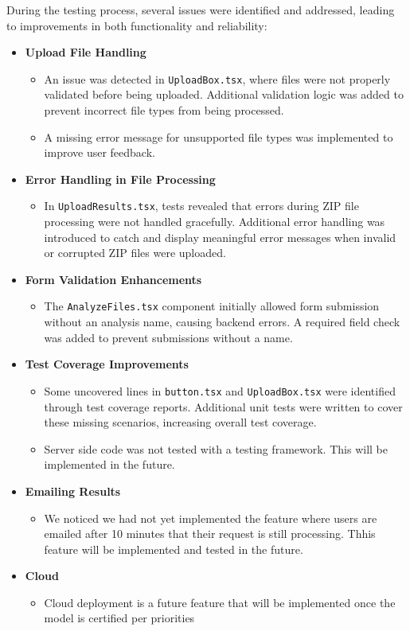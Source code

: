 \documentclass[12pt, titlepage]{article}
\begin{document}
During the testing process, several issues were identified and addressed, leading to improvements in both functionality and reliability:

\begin{itemize}
\item \textbf{Upload File Handling}
\begin{itemize}
\item An issue was detected in \texttt{UploadBox.tsx}, where files were not properly validated before being uploaded. Additional validation logic was added to prevent incorrect file types from being processed.
\item A missing error message for unsupported file types was implemented to improve user feedback.
\end{itemize}
\item \textbf{Error Handling in File Processing}
\begin{itemize}
\item In \texttt{UploadResults.tsx}, tests revealed that errors during ZIP file processing were not handled gracefully. Additional error handling was introduced to catch and display meaningful error messages when invalid or corrupted ZIP files were uploaded.
\end{itemize}
\item \textbf{Form Validation Enhancements}
\begin{itemize}
\item The \texttt{AnalyzeFiles.tsx} component initially allowed form submission without an analysis name, causing backend errors. A required field check was added to prevent submissions without a name.
\end{itemize}
\item \textbf{Test Coverage Improvements}
\begin{itemize}
\item Some uncovered lines in \texttt{button.tsx} and \texttt{UploadBox.tsx} were identified through test coverage reports. Additional unit tests were written to cover these missing scenarios, increasing overall test coverage.
\item Server side code was not tested with a testing framework. This will be implemented in the future.
\end{itemize}
\item \textbf{Emailing Results}
\begin{itemize}
\item We noticed we had not yet implemented the feature where users are emailed after 10 minutes that their request is still processing. Thhis feature will be implemented and tested in the future.
\end{itemize}
\item \textbf{Cloud}
\begin{itemize}
\item Cloud deployment is a future feature that will be implemented once the model is certified per priorities
\end{itemize}
\end{itemize}
\end{document}
